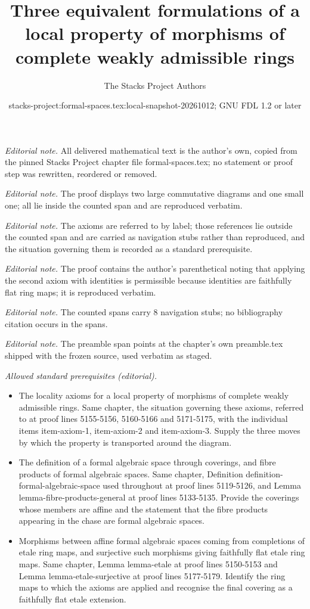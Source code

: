\documentclass{stacks-project}
\title{Three equivalent formulations of a local property of morphisms of complete weakly admissible rings}
\author{The Stacks Project Authors}
\date{stacks-project:formal-spaces.tex:local-snapshot-20261012; GNU FDL 1.2 or later}
\theoremstyle{plain}
\theoremstyle{definition}
\theoremstyle{remark}
\numberwithin{equation}{subsection}
\begin{document}
\maketitle
\noindent\textit{Editorial note.} All delivered mathematical text is the author's own, copied from the pinned Stacks Project chapter file formal-spaces.tex; no statement or proof step was rewritten, reordered or removed.\par\medskip
\noindent\textit{Editorial note.} The proof displays two large commutative diagrams and one small one; all lie inside the counted span and are reproduced verbatim.\par\medskip
\noindent\textit{Editorial note.} The axioms are referred to by label; those references lie outside the counted span and are carried as navigation stubs rather than reproduced, and the situation governing them is recorded as a standard prerequisite.\par\medskip
\noindent\textit{Editorial note.} The proof contains the author's parenthetical noting that applying the second axiom with identities is permissible because identities are faithfully flat ring maps; it is reproduced verbatim.\par\medskip
\noindent\textit{Editorial note.} The counted spans carry 8 navigation stubs; no bibliography citation occurs in the spans.\par\medskip
\noindent\textit{Editorial note.} The preamble span points at the chapter's own preamble.tex shipped with the frozen source, used verbatim as staged.\par\medskip
\noindent\textit{Allowed standard prerequisites (editorial).}\begin{itemize}
\item The locality axioms for a local property of morphisms of complete weakly admissible rings. Same chapter, the situation governing these axioms, referred to at proof lines 5155-5156, 5160-5166 and 5171-5175, with the individual items item-axiom-1, item-axiom-2 and item-axiom-3. Supply the three moves by which the property is transported around the diagram.
\item The definition of a formal algebraic space through coverings, and fibre products of formal algebraic spaces. Same chapter, Definition definition-formal-algebraic-space used throughout at proof lines 5119-5126, and Lemma lemma-fibre-products-general at proof lines 5133-5135. Provide the coverings whose members are affine and the statement that the fibre products appearing in the chase are formal algebraic spaces.
\item Morphisms between affine formal algebraic spaces coming from completions of etale ring maps, and surjective such morphisms giving faithfully flat etale ring maps. Same chapter, Lemma lemma-etale at proof lines 5150-5153 and Lemma lemma-etale-surjective at proof lines 5177-5179. Identify the ring maps to which the axioms are applied and recognise the final covering as a faithfully flat etale extension.
\end{itemize}\medskip
\end{document}
